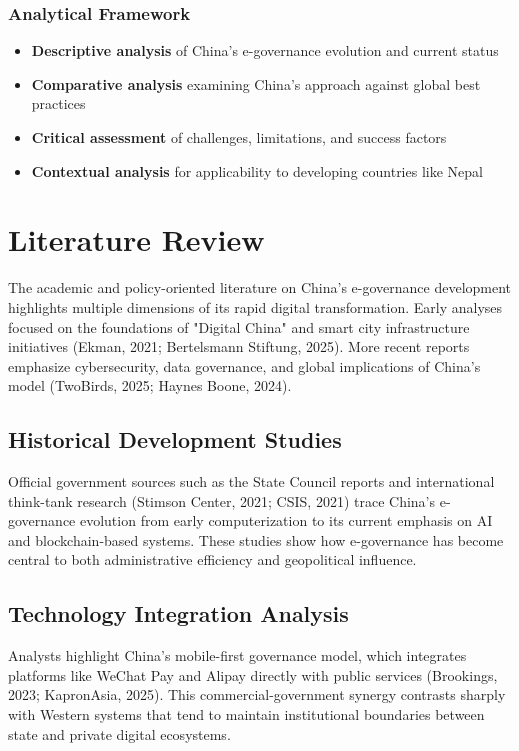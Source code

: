 \documentclass[12pt,a4paper]{article}
\begin{document}
\subsubsection{Analytical Framework}
\begin{itemize}
    \item \textbf{Descriptive analysis} of China's e-governance evolution and current status
    \item \textbf{Comparative analysis} examining China's approach against global best practices
    \item \textbf{Critical assessment} of challenges, limitations, and success factors
    \item \textbf{Contextual analysis} for applicability to developing countries like Nepal
\end{itemize}
\section{Literature Review}

The academic and policy-oriented literature on China's e-governance development highlights multiple dimensions of its rapid digital transformation. Early analyses focused on the foundations of "Digital China" and smart city infrastructure initiatives (Ekman, 2021; Bertelsmann Stiftung, 2025). More recent reports emphasize cybersecurity, data governance, and global implications of China's model (TwoBirds, 2025; Haynes Boone, 2024).

\subsection{Historical Development Studies}

Official government sources such as the State Council reports \cite{GovCN2024, GovCNTopNews2021} and international think-tank research (Stimson Center, 2021; CSIS, 2021) trace China's e-governance evolution from early computerization to its current emphasis on AI and blockchain-based systems. These studies show how e-governance has become central to both administrative efficiency and geopolitical influence.

\subsection{Technology Integration Analysis}

Analysts highlight China's mobile-first governance model, which integrates platforms like WeChat Pay and Alipay directly with public services (Brookings, 2023; KapronAsia, 2025). This commercial-government synergy contrasts sharply with Western systems that tend to maintain institutional boundaries between state and private digital ecosystems.
\end{document}
